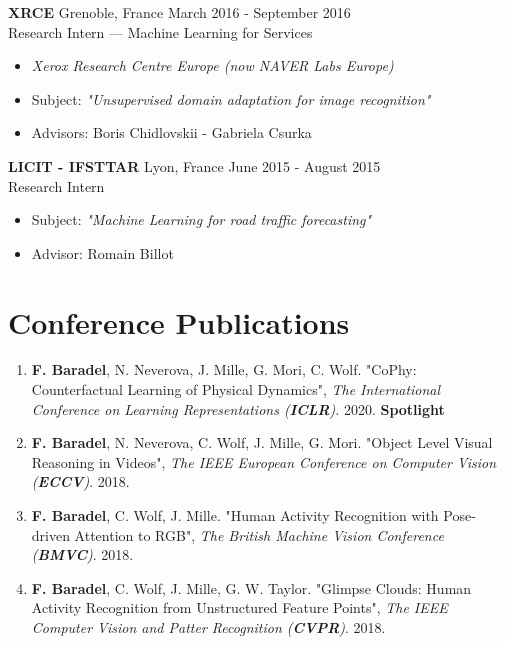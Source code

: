 \documentclass[10pt]{res} %
\begin{document}
\begin{resume}
\textbf{XRCE} \hfill Grenoble, France \hfill March 2016 - September 2016 \\
Research Intern --- Machine Learning for Services
\begin{itemize}
\item \textit{Xerox Research Centre Europe (now NAVER Labs Europe)}
\item Subject: \textit{"Unsupervised domain adaptation for image recognition"}
\item Advisors: Boris Chidlovskii - Gabriela Csurka
\end{itemize}

\textbf{LICIT - IFSTTAR} \hfill Lyon, France \hfill June 2015 - August 2015 \\
Research Intern
\begin{itemize}
\item Subject: \textit{"Machine Learning for road traffic forecasting"}
\item Advisor: Romain Billot
\end{itemize}


\section{\large Conference Publications} 
\begin{enumerate}[wide=0pt]
	\item \textbf{F. Baradel}, N. Neverova, J. Mille, G. Mori, C. Wolf. "CoPhy: Counterfactual Learning of Physical Dynamics", \textit{The International Conference on Learning Representations (\textbf{ICLR})}. 2020. \textbf{Spotlight}
	\item \textbf{F. Baradel}, N. Neverova, C. Wolf, J. Mille, G. Mori. "Object Level Visual Reasoning in Videos", \textit{The IEEE European Conference on Computer Vision (\textbf{ECCV})}. 2018.
	\item \textbf{F. Baradel}, C. Wolf, J. Mille. "Human Activity Recognition with Pose-driven Attention to RGB", \textit{The British Machine Vision Conference (\textbf{BMVC})}. 2018.
	\item \textbf{F. Baradel}, C. Wolf, J. Mille, G. W. Taylor. "Glimpse Clouds: Human Activity Recognition from Unstructured Feature Points", \textit{The IEEE Computer Vision and Patter Recognition (\textbf{CVPR})}. 2018.
\end{enumerate}




\end{resume}
\end{document}
